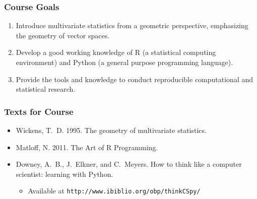 \documentclass{beamer}
\begin{document}
\begin{frame}
  \frametitle{Course Goals}

\begin{enumerate}

\item Introduce multivariate statistics from a geometric perspective, emphasizing the geometry of vector spaces.

\item Develop a good working knowledge of R (a statistical computing environment) and Python (a general purpose programming language).

\item Provide the tools and knowledge to conduct reproducible computational and statistical research.


\end{enumerate}

\end{frame}




\begin{frame}
  \frametitle{Texts for Course}

\begin{itemize}

\item Wickens, T.\ D. 1995. The geometry of multivariate statistics.

\item Matloff, N. 2011. The Art of R Programming.

\item Downey, A.\ B., J.\ Elkner, and C.\ Meyers. How to think like a computer scientist: learning with Python.
\begin{itemize}
	\item Available at \texttt{http://www.ibiblio.org/obp/thinkCSpy/}
\end{itemize}


\end{itemize}

\end{frame}
\end{document}
